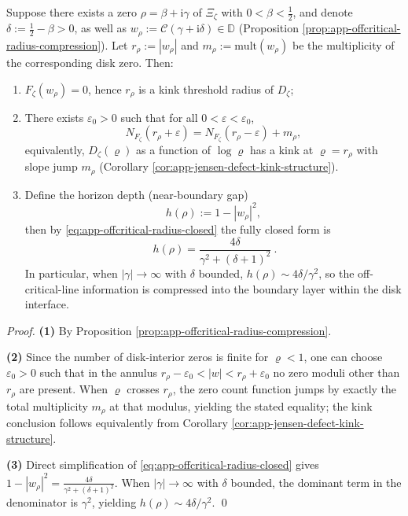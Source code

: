 \begin{theorem}\label{thm:app-jensen-offcritical-kink-localization}
Suppose there exists a zero \(\rho=\beta+\mathrm{i}\gamma\) of \(\Xi_{\zeta}\) with \(0<\beta<\tfrac12\), and denote \(\delta:=\tfrac12-\beta>0\),
as well as \(w_{\rho}:=\mathcal{C}(\gamma+\mathrm{i}\delta)\in\mathbb{D}\) (Proposition \ref{prop:app-offcritical-radius-compression}).
Let \(r_{\rho}:=|w_{\rho}|\) and \(m_{\rho}:=\mathrm{mult}(w_{\rho})\) be the multiplicity of the corresponding disk zero.
Then:
\begin{enumerate}
  \item \(F_{\zeta}(w_{\rho})=0\), hence \(r_{\rho}\) is a kink threshold radius of \(D_{\zeta}\);
  \item There exists \(\varepsilon_0>0\) such that for all \(0<\varepsilon<\varepsilon_0\),
  \[
  N_{F_{\zeta}}(r_{\rho}+\varepsilon)=N_{F_{\zeta}}(r_{\rho}-\varepsilon)+m_{\rho},
  \]
  equivalently, \(D_{\zeta}(\varrho)\) as a function of \(\log\varrho\) has a kink at \(\varrho=r_{\rho}\) with slope jump \(m_{\rho}\) (Corollary \ref{cor:app-jensen-defect-kink-structure}).
  \item Define the horizon depth (near-boundary gap)
  \[
  h(\rho):=1-|w_{\rho}|^{2},
  \]
  then by \eqref{eq:app-offcritical-radius-closed} the fully closed form is
  \[
  \boxed{\ h(\rho)=\frac{4\delta}{\gamma^{2}+(\delta+1)^{2}}\ }.
  \]
  In particular, when \(|\gamma|\to\infty\) with \(\delta\) bounded, \(h(\rho)\sim 4\delta/\gamma^{2}\), so the off-critical-line information is compressed into the boundary layer within the disk interface.
\end{enumerate}
\end{theorem}
\begin{proof}
\textbf{(1)} By Proposition \ref{prop:app-offcritical-radius-compression}.
\par
\textbf{(2)} Since the number of disk-interior zeros is finite for \(\varrho<1\), one can choose \(\varepsilon_0>0\) such that in the annulus
\(
r_{\rho}-\varepsilon_0<|w|<r_{\rho}+\varepsilon_0
\)
no zero moduli other than \(r_{\rho}\) are present.
When \(\varrho\) crosses \(r_{\rho}\), the zero count function jumps by exactly the total multiplicity \(m_{\rho}\) at that modulus, yielding the stated equality; the kink conclusion follows equivalently from Corollary \ref{cor:app-jensen-defect-kink-structure}.
\par
\textbf{(3)} Direct simplification of \eqref{eq:app-offcritical-radius-closed} gives
\(
1-|w_{\rho}|^{2}=\frac{4\delta}{\gamma^{2}+(\delta+1)^{2}}
\).
When \(|\gamma|\to\infty\) with \(\delta\) bounded, the dominant term in the denominator is \(\gamma^{2}\), yielding \(h(\rho)\sim 4\delta/\gamma^{2}\).
\qed
\end{proof}

